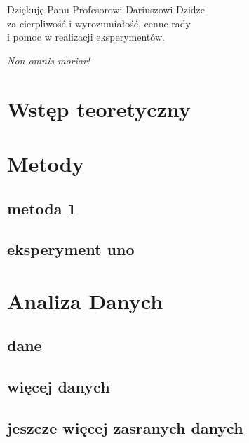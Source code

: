 \documentclass[12pt, a4paper]{article}
\begin{document}


\newpage
\thispagestyle{empty}
\begin{flushright}
    Dziękuję Panu Profesorowi Dariuszowi Dzidze\\
    za cierpliwość i wyrozumiałość, cenne rady\\
    i pomoc w realizacji eksperymentów.
\end{flushright}
\vspace*{\fill}
\begin{flushleft}
    \textit{Non omnis moriar!}
\end{flushleft}


\newpage
\setcounter{page}{3}

\tableofcontents



\section{Wstęp teoretyczny}\label{sec:wstęp-teoretyczny}


\section{Metody}\label{sec:metody}

\subsection{metoda 1}
\lipsum[2]
\subsection{eksperyment uno}
\lipsum[3-5]

\section{Analiza Danych}\label{sec:analiza-danych}
\subsection{dane}
\lipsum[2-4]
\subsection{więcej danych}
\lipsum[2-4]
\subsection{jeszcze więcej zasranych danych}
\lipsum[2-4]

\begin{otherlanguage}{polish}
    \newpage
    \thispagestyle{empty}
    
    
\end{otherlanguage}
\end{document}
